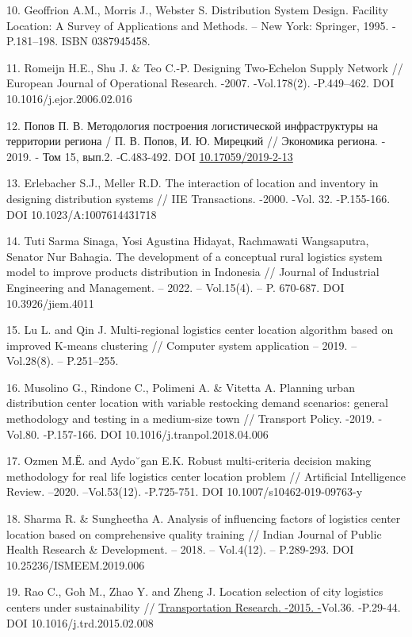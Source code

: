 \begin{references}
10. Geoffrion A.M., Morris J., Webster S. Distribution System Design.
Facility Location: A Survey of Applications and Methods. -- New York:
Springer, 1995. -P.181--198. ISBN 0387945458.

11. Romeijn H.E., Shu J. \& Teo C.-P. Designing Two-Echelon Supply Network
// European Journal of Operational Research. -2007. -Vol.178(2).
-P.449--462. DOI 10.1016/j.ejor.2006.02.016

12. Попов П. В. Методология построения логистической инфраструктуры на
территории региона / П. В. Попов, И. Ю. Мирецкий // Экономика региона.
- 2019. - Том 15, вып.2. -С.483-492. DOI
\href{http://dx.doi.org/10.17059/2019-2-13}{10.17059/2019-2-13}

13. Erlebacher S.J., Meller R.D. The interaction of location and inventory
in designing distribution systems // IIE Transactions. -2000. -Vol.
32. -P.155-166. DOI 10.1023/A:1007614431718

14. Tuti Sarma Sinaga, Yosi Agustina Hidayat, Rachmawati Wangsaputra,
Senator Nur Bahagia. The development of a conceptual rural logistics
system model to improve products distribution in Indonesia // Journal
of Industrial Engineering and Management. -- 2022. -- Vol.15(4). -- P.
670-687. DOI \\10.3926/jiem.4011

15. Lu L. and Qin J. Multi-regional logistics center location algorithm
based on improved K-means clustering // Computer system application --
2019. -- Vol.28(8). -- P.251--255.

16. Musolino G., Rindone C., Polimeni A. \& Vitetta A. Planning urban
distribution center location with variable restocking demand
scenarios: general methodology and testing in a medium-size town //
Transport Policy. -2019. -Vol.80. -P.157-166. DOI
10.1016/j.tranpol.2018.04.006

17. Ozmen M.Ё. and Aydo˘gan E.K. Robust multi-criteria decision making
methodology for real life logistics center location problem //
Artificial Intelligence Review. --2020. --Vol.53(12). -P.725-751.
DOI 10.1007/s10462-019-09763-y

18. Sharma R. \& Sungheetha A. Analysis of influencing factors of
logistics center location based on comprehensive quality training //
Indian Journal of Public Health Research \& Development. -- 2018. --
Vol.4(12). -- P.289-293. DOI 10.25236/ISMEEM.2019.006

19. Rao C., Goh M., Zhao Y. and Zheng J. Location selection of city
logistics centers under sustainability //
\href{https://www.sciencedirect.com/journal/transportation-research-part-d-transport-and-environment}{Transportation
Research. -2015.
-}Vol.36. -P.29-44.
DOI 10.1016/j.trd.2015.02.008


\end{references}
